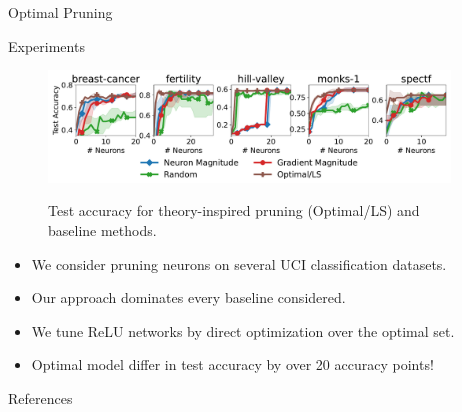 \documentclass[12pt, usenames, dvipsnames]{beamer}
\newlength{\sepwidth}
\newlength{\colwidth}
\newcommand{\separatorcolumn}{\begin{column}{\sepwidth}\end{column}}
\newcommand{\red}[1]{\textcolor{CBRed}{#1}}
\newcommand{\blue}[1]{\textcolor{CBBlue}{#1}}
\begin{document}
\begin{frame}[t]
\begin{columns}[t]
\begin{column}{\colwidth}
\begin{block}{Optimal Pruning}
			\end{block}
			\vspace{-1em}
			\begin{block}{Experiments}
				\large
				\begin{figure}[]
					\centering
					\includegraphics[width=\textwidth]{assets/uci_pruning_acc.pdf}
					\label{fig:purning}
					\vspace{-2em}
					\caption{Test accuracy for theory-inspired pruning (Optimal/LS) and baseline methods.}
				\end{figure}
				\vspace{-0.5em}
				\begin{itemize}
					\item We consider pruning neurons on several UCI
					      classification datasets.
					\item Our approach \blue{dominates} every baseline considered.
				\end{itemize}

				\vspace{-0.5em}
				
				\begin{itemize}
					\item We tune ReLU networks by direct optimization over the optimal set.
					\item Optimal model differ in test accuracy by over \red{20 accuracy points}!
				\end{itemize}

			\end{block}
			\vspace{-1em}

			\begin{block}{References}

				\footnotesize{
					
				}
				

			\end{block}

		\end{column}

		\separatorcolumn
	\end{columns}
\end{frame}
\end{document}
